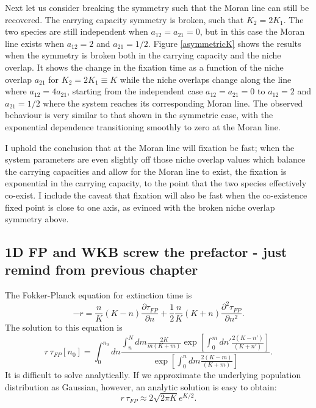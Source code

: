Next let us consider breaking the symmetry such that the Moran line can still be recovered.
The carrying capacity symmetry is broken, such that $K_2 = 2 K_1$.
The two species are still independent when $a_{12}=a_{21}=0$, but in this case the Moran line exists when $a_{12} = 2$ and $a_{21} = 1/2$.
Figure \ref{asymmetricK} shows the results when the symmetry is broken both in the carrying capacity and the niche overlap.
It shows the change in the fixation time as a function of the niche overlap $a_{21}$ for $K_2=2K_1\equiv K$ while the niche overlaps change along the line where $a_{12}=4 a_{21}$, starting from the independent case $a_{12}=a_{21}=0$ to $a_{12} = 2$ and $a_{21} = 1/2$ where the system reaches its corresponding Moran line.
The observed behaviour is very similar to that shown in the symmetric case, with the exponential dependence transitioning smoothly to zero at the Moran line.

I uphold the conclusion that at the Moran line will fixation be fast; when the system parameters are even slightly off those niche overlap values which balance the carrying capacities and allow for the Moran line to exist, the fixation is exponential in the carrying capacity, to the point that the two species effectively co-exist. 
I include the caveat that fixation will also be fast when the co-existence fixed point is close to one axis, as evinced with the broken niche overlap symmetry above. 


\iffalse
\subsection{1D FP and WKB screw the prefactor - just remind from previous chapter}
The Fokker-Planck equation for extinction time is \cite{Nisbet1982}
\begin{equation}
-r = \frac{n}{K}(K-n)\frac{\partial\tau_{FP}}{\partial n}+\frac{1}{2}\frac{n}{K}(K+n)\frac{\partial^2\tau_{FP}}{\partial n^2}.  
\end{equation}
The solution to this equation is
\begin{equation} \label{fpe-etime}
r\,\tau_{FP}[n_0] = \int^{n_0}_0 dn\frac{\int_n^N dm\frac{2K}{m(K+m)}\exp[\int^m_0dn'\frac{2(K-n')}{(K+n')}]}{\exp[\int^n_0dm\frac{2(K-m)}{(K+m)}]}.  
\end{equation}
It is difficult to solve analytically. 
If we approximate the underlying population distribution as Gaussian, however, an analytic solution is easy to obtain:
\begin{equation}
r\,\tau_{FP} \approx 2\sqrt{2\pi K}e^{K/2}. 
\end{equation}

